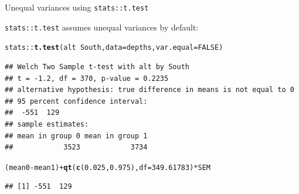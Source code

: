 \documentclass[10pt,handout]{beamer}\usepackage[]{graphicx}\usepackage[]{color}
\makeatletter
\newcommand{\hlnum}[1]{\textcolor[rgb]{0.686,0.059,0.569}{#1}}%
\newcommand{\hlopt}[1]{\textcolor[rgb]{0,0,0}{#1}}%
\newcommand{\hlstd}[1]{\textcolor[rgb]{0.345,0.345,0.345}{#1}}%
\newcommand{\hlkwc}[1]{\textcolor[rgb]{0.333,0.667,0.333}{#1}}%
\newcommand{\hlkwd}[1]{\textcolor[rgb]{0.737,0.353,0.396}{\textbf{#1}}}%
\newenvironment{kframe}{%
 \def\at@end@of@kframe{}%
 \ifinner\ifhmode%
  \def\at@end@of@kframe{\end{minipage}}%
  \begin{minipage}{\columnwidth}%
 \fi\fi%
 \def\FrameCommand##1{\hskip\@totalleftmargin \hskip-\fboxsep
 \colorbox{shadecolor}{##1}\hskip-\fboxsep
     \hskip-\linewidth \hskip-\@totalleftmargin \hskip\columnwidth}%
 \MakeFramed {\advance\hsize-\width
   \@totalleftmargin\z@ \linewidth\hsize
   \@setminipage}}%
 {\par\unskip\endMakeFramed%
 \at@end@of@kframe}
\newenvironment{knitrout}{}{} %
\makeatother
\begin{document}
\begin{frame}[fragile]{Unequal variances using \texttt{stats::t.test}}
	
	\texttt{stats::t.test} assumes unequal variances by default:
	
	
\begin{knitrout}\scriptsize
{}\color{fgcolor}\begin{kframe}
\begin{alltt}
\hlstd{stats}\hlopt{::}\hlkwd{t.test}\hlstd{(alt} \hlopt{~} \hlstd{South,} \hlkwc{data} \hlstd{= depths,} \hlkwc{var.equal} \hlstd{=} \hlnum{FALSE}\hlstd{)}
\end{alltt}
\begin{verbatim}
## Welch Two Sample t-test with alt by South 
## t = -1.2, df = 370, p-value = 0.2235
## alternative hypothesis: true difference in means is not equal to 0 
## 95 percent confidence interval:
##  -551  129 
## sample estimates:
## mean in group 0 mean in group 1 
##            3523            3734
\end{verbatim}
\begin{alltt}
\hlstd{(mean0} \hlopt{-} \hlstd{mean1)} \hlopt{+} \hlkwd{qt}\hlstd{(}\hlkwd{c}\hlstd{(}\hlnum{0.025}\hlstd{,} \hlnum{0.975}\hlstd{),} \hlkwc{df} \hlstd{=} \hlnum{349.61783}\hlstd{)} \hlopt{*} \hlstd{SEM}
\end{alltt}
\begin{verbatim}
## [1] -551  129
\end{verbatim}
\end{kframe}
\end{knitrout}
	
	
\end{frame}
\end{document}
